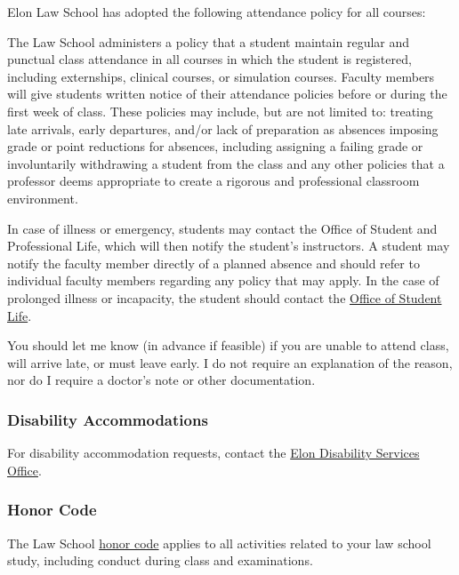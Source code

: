 \documentclass[11pt,letterpaper,twoside]{article}
\renewenvironment{quote}{%
   \list{}{%
     \leftmargin2em   %
     \rightmargin\leftmargin\parsep .1em }
   \item\relax
}
{\endlist}
\begin{document}
Elon Law School has adopted the following attendance policy for all
courses:

\begin{quote}
The Law School administers a policy that a student maintain regular and
punctual class attendance in all courses in which the student is
registered, including externships, clinical courses, or simulation
courses. Faculty members will give students written notice of their
attendance policies before or during the first week of class. These
policies may include, but are not limited to: treating late arrivals,
early departures, and/or lack of preparation as absences imposing grade
or point reductions for absences, including assigning a failing grade or
involuntarily withdrawing a student from the class and any other
policies that a professor deems appropriate to create a rigorous and
professional classroom environment.

In case of illness or emergency, students may contact the Office of
Student and Professional Life, which will then notify the student's
instructors. A student may notify the faculty member directly of a
planned absence and should refer to individual faculty members regarding
any policy that may apply. In the case of prolonged illness or
incapacity, the student should contact the
\href{https://www.elon.edu/u/law/students/}{Office of Student Life}.
\end{quote}

You should let me know (in advance if feasible) if you are unable to
attend class, will arrive late, or must leave early. I do not require an
explanation of the reason, nor do I require a doctor's note or other
documentation.

\subsubsection{Disability
Accommodations}\label{disability-accommodations}

For disability accommodation requests, contact the
\href{https://www.elon.edu/u/academics/koenigsberger-learning-center/disabilities-resources/homepage/graduate-student-resources/}{Elon
Disability Services Office}.

\subsubsection{Honor Code}\label{honor-code}

The Law School
\href{https://www.elon.edu/u/law/students/honor-code/}{honor code}
applies to all activities related to your law school study, including
conduct during class and examinations.
\end{document}
